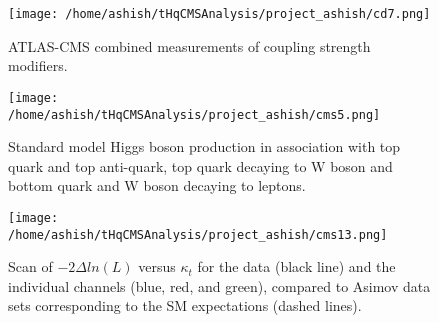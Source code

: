 \documentclass[final,3p]{CSP}
\begin{document}
   
\begin{figure}
  \centering
   \texttt{[image: /home/ashish/tHqCMSAnalysis/project\_ashish/cd7.png]}
  \caption{ATLAS-CMS combined measurements of coupling strength modifiers.}
   \label{figure 3}
\end{figure}


\begin{figure}
  \centering
  \texttt{[image: /home/ashish/tHqCMSAnalysis/project\_ashish/cms5.png]}
  \caption{Standard model Higgs boson production in association with top quark and top anti-quark, top quark decaying to W boson and bottom quark and  W boson decaying to leptons.}
   \label{figure 4}
\end{figure}

\begin{figure}
  \centering
  \texttt{[image: /home/ashish/tHqCMSAnalysis/project\_ashish/cms13.png]}
  \caption{Scan of $−2Δln(L)$ versus $κ_t$ for the data (black line) and the individual channels (blue, red, and green), compared to Asimov data sets corresponding to the SM expectations (dashed lines).}
   \label{figure 5}
\end{figure}
\end{document}
